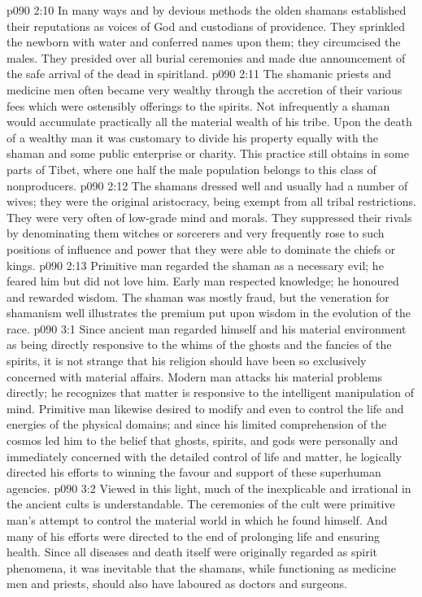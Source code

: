 \vs p090 2:10 In many ways and by devious methods the olden shamans established their reputations as voices of God and custodians of providence. They sprinkled the newborn with water and conferred names upon them; they circumcised the males. They presided over all burial ceremonies and made due announcement of the safe arrival of the dead in spiritland.
\vs p090 2:11 The shamanic priests and medicine men often became very wealthy through the accretion of their various fees which were ostensibly offerings to the spirits. Not infrequently a shaman would accumulate practically all the material wealth of his tribe. Upon the death of a wealthy man it was customary to divide his property equally with the shaman and some public enterprise or charity. This practice still obtains in some parts of Tibet, where one half the male population belongs to this class of nonproducers.
\vs p090 2:12 The shamans dressed well and usually had a number of wives; they were the original aristocracy, being exempt from all tribal restrictions. They were very often of low\hyp{}grade mind and morals. They suppressed their rivals by denominating them witches or sorcerers and very frequently rose to such positions of influence and power that they were able to dominate the chiefs or kings.
\vs p090 2:13 Primitive man regarded the shaman as a necessary evil; he feared him but did not love him. Early man respected knowledge; he honoured and rewarded wisdom. The shaman was mostly fraud, but the veneration for shamanism well illustrates the premium put upon wisdom in the evolution of the race.
\vs p090 3:1 Since ancient man regarded himself and his material environment as being directly responsive to the whims of the ghosts and the fancies of the spirits, it is not strange that his religion should have been so exclusively concerned with material affairs. Modern man attacks his material problems directly; he recognizes that matter is responsive to the intelligent manipulation of mind. Primitive man likewise desired to modify and even to control the life and energies of the physical domains; and since his limited comprehension of the cosmos led him to the belief that ghosts, spirits, and gods were personally and immediately concerned with the detailed control of life and matter, he logically directed his efforts to winning the favour and support of these superhuman agencies.
\vs p090 3:2 Viewed in this light, much of the inexplicable and irrational in the ancient cults is understandable. The ceremonies of the cult were primitive man’s attempt to control the material world in which he found himself. And many of his efforts were directed to the end of prolonging life and ensuring health. Since all diseases and death itself were originally regarded as spirit phenomena, it was inevitable that the shamans, while functioning as medicine men and priests, should also have laboured as doctors and surgeons.
